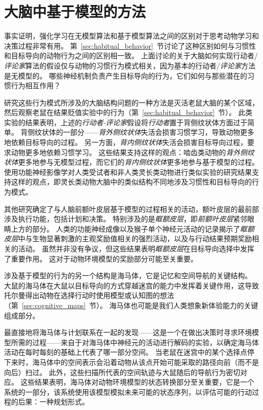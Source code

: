 \section{大脑中基于模型的方法}

事实证明，强化学习在无模型算法和基于模型算法之间的区别对于思考动物学习和决策过程非常有用。
第~\ref{sec:habitual_behavior}~节讨论了这种区别如何与习惯性和目标导向的动物行为之间的区别相一致。
上面讨论的关于大脑如何实现行动者/\textit{评论家}算法的假设仅与动物的习惯行为模式相关，因为基本的行动者/\textit{评论家}方法是无模型的。
哪些神经机制负责产生目标导向的行为，它们如何与那些潜在的习惯行为相互作用？


研究这些行为模式所涉及的大脑结构问题的一种方法是灭活老鼠大脑的某个区域，然后观察老鼠在结果贬值实验中的行为（第~\ref{sec:habitual_behavior}~节）。
此类实验的结果表明，上述的\textit{行动者-评论家}假设将\textit{行动者}置于背侧纹状体方面过于简单。
背侧纹状体的一部分——\textit{背外侧纹状体}失活会损害习惯学习，导致动物更多地依赖目标导向的过程。
另一方面，\textit{背内侧纹状体}失活会损害目标导向过程，要求动物更多地依赖习惯学习。
这些结果支持这样的观点：啮齿类动物的\textit{背外侧纹状体}更多地参与无模型过程，而它们的\textit{背内侧纹状体}更多地参与基于模型的过程。
使用功能神经影像学对人类受试者和非人类灵长类动物进行类似实验的研究结果支持这样的观点，即灵长类动物大脑中的类似结构不同地涉及习惯性和目标导向的行为模式。


其他研究确定了与人脑前额叶皮层基于模型的过程相关的活动，额叶皮层的最前部涉及执行功能，包括计划和决策。
特别涉及的是\textit{眶额皮层}，即\textit{前额叶皮层}紧邻眼睛上方的部分。
人类的功能神经成像以及猴子单个神经元活动的记录揭示了\textit{眶额皮层}中与生物显著刺激的主观奖励值相关的强烈活动，以及与行动结果预期奖励相关的活动。
虽然并非没有争议，但这些结果表明\textit{眶额皮层}在目标导向选择中发挥了重要作用。
这对于动物环境模型的奖励部分可能至关重要。


涉及基于模型的行为的另一个结构是海马体，它是记忆和空间导航的关键结构。
大鼠的海马体在大鼠以目标导向的方式穿越迷宫的能力中发挥着关键作用，这导致托尔曼得出动物在选择行动时使用模型或认知图的想法（第~\ref{sec:cognitive_maps}~节）。
海马体也可能是我们人类想象新体验能力的关键组成部分\cite{hassabis2007deconstructing,olafsdottir2015hippocampal}。


最直接地将海马体与计划联系在一起的发现——这是一个在做出决策时寻求环境模型所需的过程——来自于对海马体中神经元的活动进行解码的实验，以确定海马体活动在每时每刻的基础上代表了哪一部分空间。
当老鼠在迷宫中的某个选择点停下来时，海马体中的空间表示会沿着动物从该点开始可能采取的路径向前（而不是向后）扫过\cite{johnson2007neural}。
此外，这些扫描所代表的空间轨迹与大鼠随后的导航行为密切对应\cite{pfeiffer2013hippocampal}。
这些结果表明，海马体对动物环境模型的状态转换部分至关重要，它是一个系统的一部分，该系统使用该模型模拟未来可能的状态序列，以评估可能的行动过程的后果：一种规划形式。


